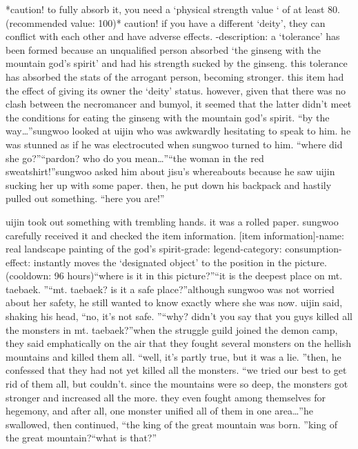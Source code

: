 *caution! to fully absorb it, you need a ‘physical strength value ‘ of at least 80.
 (recommended value: 100)* caution! if you have a different ‘deity’, they can conflict with each other and have adverse effects.
-description: a ‘tolerance’ has been formed because an unqualified person absorbed ‘the ginseng with the mountain god’s spirit’ and had his strength sucked by the ginseng.
 this tolerance has absorbed the stats of the arrogant person, becoming stronger.
this item had the effect of giving its owner the ‘deity’ status.
 however, given that there was no clash between the necromancer and bumyol, it seemed that the latter didn’t meet the conditions for eating the ginseng with the mountain god’s spirit.
“by the way…”sungwoo looked at uijin who was awkwardly hesitating to speak to him.
he was stunned as if he was electrocuted when sungwoo turned to him.
“where did she go?”“pardon? who do you mean…”“the woman in the red sweatshirt!”sungwoo asked him about jisu’s whereabouts because he saw uijin sucking her up with some paper.
 then, he put down his backpack and hastily pulled out something.
“here you are!”

uijin took out something with trembling hands.
 it was a rolled paper.
sungwoo carefully received it and checked the item information.
[item information]-name: real landscape painting of the god’s spirit-grade: legend-category: consumption-effect: instantly moves the ‘designated object’ to the position in the picture.
 (cooldown: 96 hours)“where is it in this picture?”“it is the deepest place on mt.
 taebaek.
”“mt.
 taebaek? is it a safe place?”although sungwoo was not worried about her safety, he still wanted to know exactly where she was now.
uijin said, shaking his head, “no, it’s not safe.
”“why? didn’t you say that you guys killed all the monsters in mt.
 taebaek?”when the struggle guild joined the demon camp, they said emphatically on the air that they fought several monsters on the hellish mountains and killed them all.
“well, it’s partly true, but it was a lie.
”then, he confessed that they had not yet killed all the monsters.
“we tried our best to get rid of them all, but couldn’t.
 since the mountains were so deep, the monsters got stronger and increased all the more.
 they even fought among themselves for hegemony, and after all, one monster unified all of them in one area…”he swallowed, then continued, “the king of the great mountain was born.
”king of the great mountain?“what is that?”

 